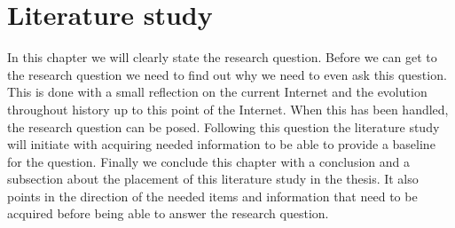\chapter{Literature study}

In this chapter we will clearly state the research question. Before we can get to the research question we need to find out why we need to even ask this question. This is done with a small reflection on the current Internet and the evolution throughout history up to this point of the Internet. When this has been handled, the research question can be posed. Following this question the literature study will initiate with acquiring needed information to be able to provide a baseline for the question. Finally we conclude this chapter with a conclusion and a subsection about the placement of this literature study in the thesis. It also points in the direction of the needed items and information that need to be acquired before being able to answer the research question.
